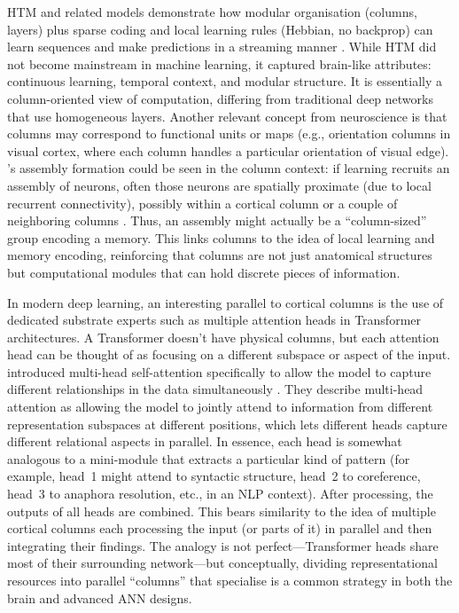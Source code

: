 HTM and related models demonstrate how modular organisation (columns, layers) plus sparse coding and local learning rules (Hebbian, no backprop) can learn sequences and make predictions in a streaming manner \citep{hawkins2011htm,numenta2019_htm_guide}.
While HTM did not become mainstream in machine learning, it captured brain-like attributes: continuous learning, temporal context, and modular structure.
It is essentially a column-oriented view of computation, differing from traditional deep networks that use homogeneous layers.
Another relevant concept from neuroscience is that columns may correspond to functional units or maps (e.g., orientation columns in visual cortex, where each column handles a particular orientation of visual edge).
\citeauthor{holtmaat2016assembly}’s assembly formation could be seen in the column context: if learning recruits an assembly of neurons, often those neurons are spatially proximate (due to local recurrent connectivity), possibly within a cortical column or a couple of neighboring columns \citep{holtmaat2016assembly}.
Thus, an assembly might actually be a ``column-sized'' group encoding a memory.
This links columns to the idea of local learning and memory encoding, reinforcing that columns are not just anatomical structures but computational modules that can hold discrete pieces of information.

In modern deep learning, an interesting parallel to cortical columns is the use of dedicated substrate experts such as multiple attention heads in Transformer architectures.
A Transformer doesn’t have physical columns, but each attention head can be thought of as focusing on a different subspace or aspect of the input.
\citet{vaswani2017attention} introduced multi-head self-attention specifically to allow the model to capture different relationships in the data simultaneously \citep{vaswani2017attention}. 
They describe multi-head attention as allowing the model to jointly attend to information from different representation subspaces at different positions, which lets different heads capture different relational aspects in parallel.
In essence, each head is somewhat analogous to a mini-module that extracts a particular kind of pattern (for example, head~1 might attend to syntactic structure, head~2 to coreference, head~3 to anaphora resolution, etc., in an NLP context).
After processing, the outputs of all heads are combined.
This bears similarity to the idea of multiple cortical columns each processing the input (or parts of it) in parallel and then integrating their findings.
The analogy is not perfect---Transformer heads share most of their surrounding network---but conceptually, dividing representational resources into parallel ``columns'' that specialise is a common strategy in both the brain and advanced ANN designs.

